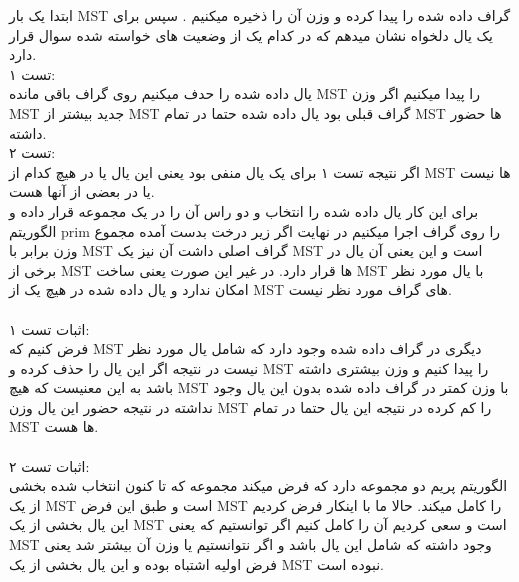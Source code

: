 \problem{}
ابتدا یک بار MST گراف داده شده را پیدا کرده و وزن آن را ذخیره میکنیم . سپس
برای یک یال دلخواه نشان میدهم که در کدام یک از وضعیت های خواسته شده سوال 
قرار دارد.\\
تست ۱:\\
یال داده شده را حدف میکنیم 
روی گراف باقی مانده MST را پیدا میکنیم 
اگر وزن MST جدید بیشتر از MST گراف قبلی بود یال
داده شده حتما در تمام MST ها حضور داشته.\\
تست ۲:\\
اگر نتیجه تست ۱ برای یک یال منفی بود یعنی این یال یا در هیچ کدام از MST
ها نیست یا در بعضی از آنها هست.\\
برای این کار یال داده شده را انتخاب و دو راس آن را در یک مجموعه قرار داده
و الگوریتم prim را روی گراف اجرا میکنیم
در نهایت اگر زیر درخت بدست آمده
مجموع وزن برابر با MST گراف اصلی داشت 
آن نیز یک MST است و این یعنی آن یال در برخی
از MST ها قرار دارد.
در غیر این صورت یعنی ساخت MST با یال مورد نظر امکان ندارد
و یال داده شده در هیچ یک از MST های گراف مورد نظر نیست.\\\\
اثبات تست ۱:\\
فرض کنیم که MST دیگری
در گراف داده شده وجود دارد که شامل یال مورد نظر نیست
در نتیجه اگر این یال را حذف کرده و MST را پیدا کنیم
و وزن بیشتری داشته باشد به این معنیست که هیچ MST
با وزن کمتر در گراف داده شده بدون این یال وجود نداشته
در نتیجه حضور این یال وزن MST را کم کرده در نتیجه این یال حتما
در تمام MST ها هست.\\\\
اثبات تست ۲:\\
الگوریتم پریم دو مجموعه دارد که فرض میکند مجموعه که تا کنون انتخاب شده
بخشی از یک MST است و طبق این فرض
MST را کامل میکند.
حالا ما با اینکار فرض کردیم این یال بخشی از یک MST است
و سعی کردیم آن را کامل کنیم 
اگر توانستیم که یعنی MST وجود داشته که شامل این یال باشد
و اگر نتوانستیم یا وزن آن بیشتر شد یعنی فرض اولیه اشتباه بوده
و این یال بخشی از یک MST نبوده است.
